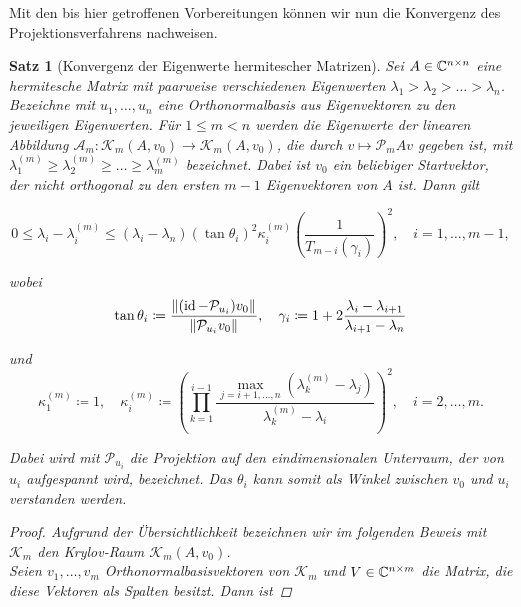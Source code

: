 \documentclass{article}
\theoremstyle{plain}
\newtheorem{theorem}    {Satz}   [section]
\begin{document}
Mit den bis hier getroffenen Vorbereitungen können wir nun die Konvergenz des Projektionsverfahrens nachweisen.

\begin{theorem}[Konvergenz der Eigenwerte hermitescher Matrizen]
	Sei $A \in \mathbb{C}^{n \times n}$ eine hermitesche Matrix mit paarweise verschiedenen Eigenwerten $\lambda_1 > \lambda_2 > \dots > \lambda_n$. Bezeichne mit $u_1,\dots,u_n$ eine Orthonormalbasis aus Eigenvektoren zu den jeweiligen Eigenwerten. Für $1 \le m < n$ werden die Eigenwerte der linearen Abbildung $\mathcal{A}_m: \mathcal{K}_m(A,v_0)\rightarrow \mathcal{K}_m(A,v_0)$, die durch $v \mapsto \mathcal{P}_mAv$ gegeben ist,  mit $\lambda_1^{(m)} \ge \lambda_2^{(m)} \ge \dots \ge \lambda_m^{(m)}$ bezeichnet. Dabei ist $v_0$ ein beliebiger Startvektor, der nicht orthogonal zu den ersten $m-1$ Eigenvektoren von $A$ ist. Dann gilt

	\begin{equation}
		\label{konvergenz Eigenwerte}
		0 \le \lambda_i - \lambda_i^{(m)} \le (\lambda_i -\lambda_n) (\tan\theta_i)^2 \kappa_i^{(m)} \left(\frac{1}{T_{m-i}(\gamma_i)}\right)^2, \quad i=1,\dots,m-1,
	\end{equation}

	wobei
	\begin{equation*}
		\tan \theta_i \coloneqq \frac{{\left \| (\operatorname{id} - \mathcal{P}_{u_i})v_0 \right \|}_{}}{{\left \|  \mathcal{P}_{u_i}v_0 \right \|}_{}}, \quad \gamma_i \coloneqq 1+2 \frac{\lambda_i-\lambda_{i+1}}{\lambda_{i+1} -\lambda_n}
	\end{equation*}

	und
	\begin{equation*}
		\kappa_1^{(m)} \coloneqq 1, \quad \kappa_i^{(m)} \coloneqq \left(\prod_{k=1}^{i-1} \frac{\max_{j=i+1,\dots,n} (\lambda_k^{(m)} - \lambda_j)}{\lambda_k^{(m)} - \lambda_i}\right)^2, \quad i = 2,\dots,m.
	\end{equation*}

	Dabei wird mit $\mathcal{P}_{u_i}$ die Projektion auf den eindimensionalen Unterraum, der von $u_i$ aufgespannt wird, bezeichnet. Das $\theta_i$ kann somit als Winkel zwischen $v_0$ und $u_i$  verstanden werden.
	\begin{proof}

	Aufgrund der Übersichtlichkeit bezeichnen wir im folgenden Beweis mit $\mathcal{K}_m$ den Krylov-Raum $\mathcal{K}_m(A,v_0)$.\\
	Seien $v_1, \dots, v_m$ Orthonormalbasisvektoren von $\mathcal{K}_m$ und $V \in \mathbb{C}^{n\times m}$ die Matrix, die diese Vektoren als Spalten besitzt. Dann ist


\end{proof}
\end{theorem}
\end{document}
